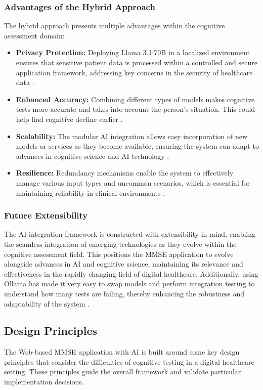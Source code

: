 \subsubsection{Advantages of the Hybrid Approach}
The hybrid approach presents multiple advantages within the cognitive assessment domain:
\begin{itemize}
\item \textbf{Privacy Protection:} Deploying Llama 3.1:70B in a localized environment ensures that sensitive patient data is processed within a controlled and secure application framework, addressing key concerns in the security of healthcare data \cite{Krutz2017}.
\item \textbf{Enhanced Accuracy:} Combining different types of models makes cognitive tests more accurate and takes into account the person's situation. This could help find cognitive decline earlier \cite{Grassi2019}.
\item \textbf{Scalability:} The modular AI integration allows easy incorporation of new models or services as they become available, ensuring the system can adapt to advances in cognitive science and AI technology \cite{Zygouris2017}.
\item \textbf{Resilience:} Redundancy mechanisms enable the system to effectively manage various input types and uncommon scenarios, which is essential for maintaining reliability in clinical environments \cite{Bauer2012}.
\end{itemize}

\subsubsection{Future Extensibility}
The AI integration framework is constructed with extensibility in mind, enabling the seamless integration of emerging technologies as they evolve within the cognitive assessment field. This positions the MMSE application to evolve alongside advances in AI and cognitive science, maintaining its relevance and effectiveness in the rapidly changing field of digital healthcare. Additionally, using Ollama has made it very easy to swap models and perform integration testing to understand how many tests are failing, thereby enhancing the robustness and adaptability of the system \cite{Ollama2024, Zygouris2017}.

\subsection{Design Principles}
The Web-based MMSE application with AI is built around some key design principles that consider the difficulties of cognitive testing in a digital healthcare setting. These principles guide the overall framework and validate particular implementation decisions.

